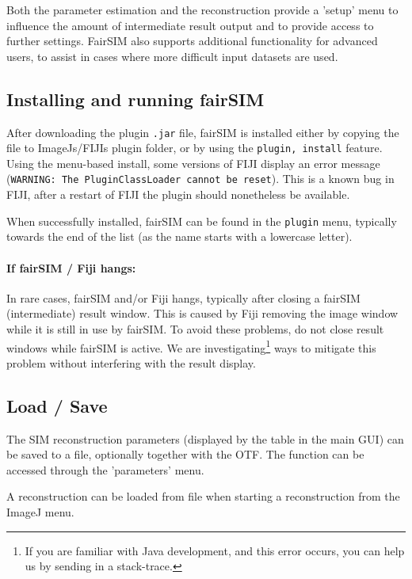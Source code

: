 \documentclass[twoside=false,
           twocolumn=false,
           a4paper,DIV=15,
           10pt]{scrartcl}
\begin{document}
Both the parameter estimation and the reconstruction
provide a 'setup' menu to influence the amount of
intermediate result output and to provide 
access to further settings.
FairSIM also supports additional functionality for
advanced users, to assist in cases where more difficult input
datasets are used.

\subsection{Installing and running fairSIM}

After downloading the plugin \verb+.jar+ file, fairSIM is
installed either by copying the file to ImageJs/FIJIs plugin
folder, or by using the \verb+plugin, install+ feature.
Using the menu-based install, some versions of
FIJI display an error message (\verb+WARNING: The PluginClassLoader cannot be reset+).
This is a known bug in FIJI, after a restart of FIJI the plugin
should nonetheless be available. 

When successfully installed, fairSIM can be found 
in the \verb+plugin+ menu, typically towards the end 
of the list (as the name starts with a lowercase letter).


\paragraph{If fairSIM / Fiji hangs:}

In rare cases, fairSIM and/or Fiji hangs, typically after
closing a fairSIM (intermediate) result window. This is
caused by Fiji removing the image window while it is
still in use by fairSIM. To avoid these problems, 
do not close result windows while
fairSIM is active. We are investigating\footnote{If
you are familiar with Java development, and this error
occurs, you can help us by sending in a stack-trace.}
ways to mitigate this problem without 
interfering with the result display.



\subsection{Load / Save}

The SIM reconstruction parameters (displayed by the table
in the main GUI) can be saved to a file, optionally together
with the OTF. The function can be accessed through the
'parameters' menu.

A reconstruction can be loaded from file when starting a
reconstruction from the ImageJ menu.
\end{document}
